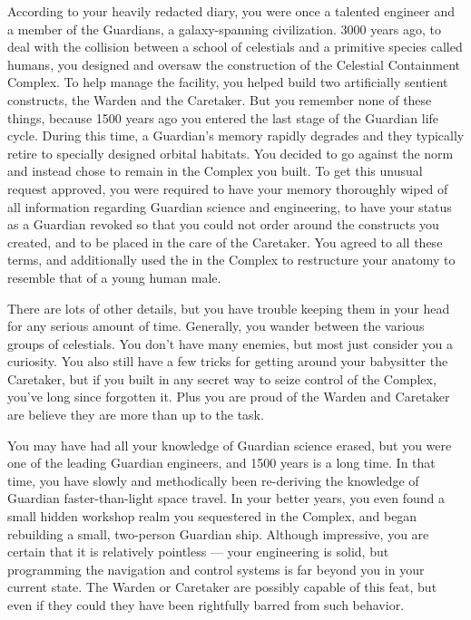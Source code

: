 \documentclass[char]{guardians}
\begin{document}
\name{\cJascha{}}

According to your heavily redacted diary, you were once a talented engineer and a member of the Guardians, a galaxy-spanning civilization. 3000 years ago, to deal with the collision between a school of celestials and a primitive species called humans, you designed and oversaw the construction of the Celestial Containment Complex. To help manage the facility, you helped build two artificially sentient constructs, the Warden and the Caretaker. But you remember none of these things, because 1500 years ago you entered the last stage of the Guardian life cycle. During this time, a Guardian's memory rapidly degrades and they typically retire to specially designed orbital habitats. You decided to go against the norm and instead chose to remain in the Complex you built. To get this unusual request approved, you were required to have your memory thoroughly wiped of all information regarding Guardian science and engineering, to have your status as a Guardian revoked so that you could not order around the constructs you created, and to be placed in the care of the Caretaker. You agreed to all these terms, and additionally used the \assembler{} in the Complex to restructure your anatomy to resemble that of a young human male.

There are lots of other details, but you have trouble keeping them in your head for any serious amount of time. Generally, you wander between the various groups of celestials. You don't have many enemies, but most just consider you a curiosity. You also still have a few tricks for getting around your babysitter the Caretaker, but if you built in any secret way to seize control of the Complex, you've long since forgotten it. Plus you are proud of the Warden and Caretaker are believe they are more than up to the task.

You may have had all your knowledge of Guardian science erased, but you were one of the leading Guardian engineers, and 1500 years is a long time. In that time, you have slowly and methodically been re-deriving the knowledge of Guardian faster-than-light space travel. In your better years, you even found a small hidden workshop realm you sequestered in the Complex, and began rebuilding a small, two-person Guardian ship. Although impressive, you are certain that it is relatively pointless --- your engineering is solid, but programming the navigation and control systems is far beyond you in your current state. The Warden or Caretaker are possibly capable of this feat, but even if they could they have been rightfully barred from such behavior.
\end{document}
